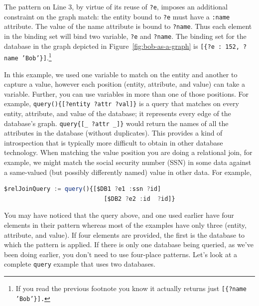 \documentclass[9pt,letterpaper]{article}
\newcommand{\stt}[1]{\texttt{#1}} %
\begin{document}
The pattern on Line 3, by virtue of its reuse of \stt{?e}, imposes an additional constraint on the graph match: the entity bound to \stt{?e} must have a \stt{:name} attribute.
The value of the name attribute is bound to \stt{?name}.
Thus each element in the binding set will bind two variable, \stt{?e} and \stt{?name}.
The binding set for the database in the graph depicted in Figure~\ref{fig:bob-as-a-graph} is \stt{[\{?e : 152, ?name 'Bob'\}]}.\footnote{If you read the previous footnote you know it actually returns just \stt{[\{?name 'Bob'\}].}}

In this example, we used one variable to match on the entity and another to capture a value, however each position (entity, attribute, and value) can take a variable.
Further, you can use variables in more than one of those positions.
For example, \stt{query()\{[?entity ?attr ?val]\}} is a query that matches on every entity, attribute, and value of the database; it represents every edge of the database's graph.
\stt{query\{[\_ ?attr \_]\}} would return the names of all the attributes in the database (without duplicates). %
This provides a kind of introspection that is typically more difficult to obtain in other database technology.
When matching the value position you are doing a relational join, for example, we might match the social security number (SSN) in
some data against a same-valued (but possibly differently named) value in other data.
For example,

\begin{lstlisting}[language=JavaScript,numbers=none,basicstyle=\ttfamily\scriptsize]
   $relJoinQuery := query(){[$DB1 ?e1 :ssn ?id]
                            [$DB2 ?e2 :id  ?id]}
\end{lstlisting} \vspace{-2em}

You may have noticed that the query above, and one used earlier have four elements in their pattern whereas most of the examples have only three (entity, attribute, and value).
If four elements are provided, the first is the database to which the pattern is applied.
If there is only one database being queried, as we've been doing earlier, you don't need to use four-place patterns.
Let's look at a complete \stt{query} example that uses two databases.
\end{document}
